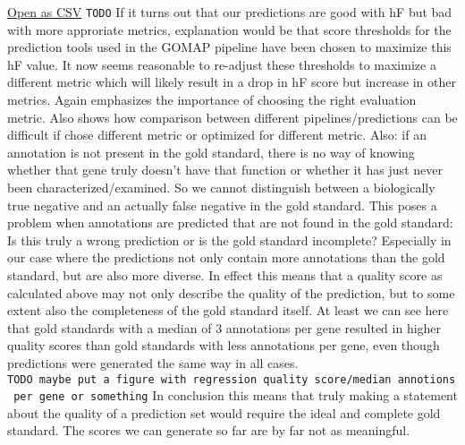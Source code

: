 \documentclass[utf8]{frontiersSCNS}
\begin{document}
\href{https://github.com/Dill-PICL/GOMAP-Paper-2019.1/blob/master/analyses/quantity/results/quantity_table.csv}{Open as CSV}
\texttt{TODO} If it turns out that our predictions are good with hF but bad with more approriate metrics, explanation would be that score thresholds for the prediction tools used in the GOMAP pipeline have been chosen to maximize this hF value. It now seems reasonable to re-adjust these thresholds to maximize a different metric which will likely result in a drop in hF score but increase in other metrics. Again emphasizes the importance of choosing the right evaluation metric.
Also shows how comparison between different pipelines/predictions can be difficult if chose different metric or optimized for different metric.
Also: if an annotation is not present in the gold standard, there is no way of knowing whether that gene truly doesn't have that function or whether it has just never been characterized/examined. So we cannot distinguish between a biologically true negative and an actually false negative in the gold standard.
This poses a problem when annotations are predicted that are not found in the gold standard: Is this truly a wrong prediction or is the gold standard incomplete? Especially in our case where the predictions not only contain more annotations than the gold standard, but are also more diverse.
In effect this means that a quality score as calculated above may not only describe the quality of the prediction, but to some extent also the completeness of the gold standard itself.
At least we can see here that gold standards with a median of 3 annotations per gene resulted in higher quality scores than gold standards with less annotations per gene, even though predictions were generated the same way in all cases.
\texttt{TODO\ maybe\ put\ a\ figure\ with\ regression\ quality\ score/median\ annotions\ per\ gene\ or\ something}
In conclusion this means that truly making a statement about the quality of a prediction set would require the ideal and complete gold standard.
The scores we can generate so far are by far not as meaningful.
\end{document}
